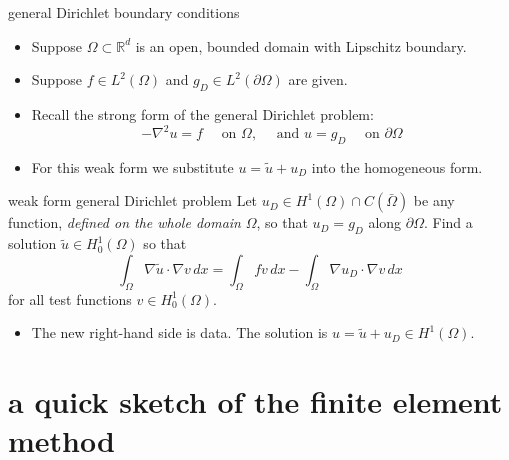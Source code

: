 \documentclass[10pt,
               svgnames,
               hyperref={colorlinks,
                         citecolor=DeepPink4,
                         linkcolor=FireBrick,
                         urlcolor=blue},
               usepdftitle=false]{beamer}
\newcommand{\RR}{\mathbb{R}}
\newcommand{\grad}{\nabla}
\begin{document}
\begin{frame}{general Dirichlet boundary conditions}

\begin{itemize}
\item Suppose $\Omega\subset \RR^d$ is an open, bounded domain with Lipschitz boundary.
\item Suppose $f\in L^2(\Omega)$ and $g_D\in L^2(\partial\Omega)$ are given.
\item Recall the strong form of the general Dirichlet problem:
   $$- \grad^2 u = f \quad \text{ on } \Omega, \quad \text{ and }
u = g_D \quad \text{ on } \partial \Omega$$
\item For this weak form we substitute $u=\tilde u+u_D$ into the homogeneous form.
\end{itemize}

\begin{block}{weak form general Dirichlet problem}
Let $u_D \in H^1(\Omega) \cap C(\bar\Omega)$ be any function, \emph{defined on the whole domain} $\Omega$, so that $u_D=g_D$ along $\partial\Omega$.  Find a solution $\tilde u\in H_0^1(\Omega)$ so that
    $$\int_\Omega \grad \tilde u \cdot \grad v\,dx = \int_\Omega f v\,dx - \int_\Omega \grad u_D \cdot \grad v\,dx$$
for all test functions $v\in H_0^1(\Omega)$.
\end{block}

\begin{itemize}
\item The new right-hand side is data.  The solution is $u=\tilde u+u_D \in H^1(\Omega)$.
\end{itemize}
\end{frame}


\section{a quick sketch of the finite element method}
\end{document}
